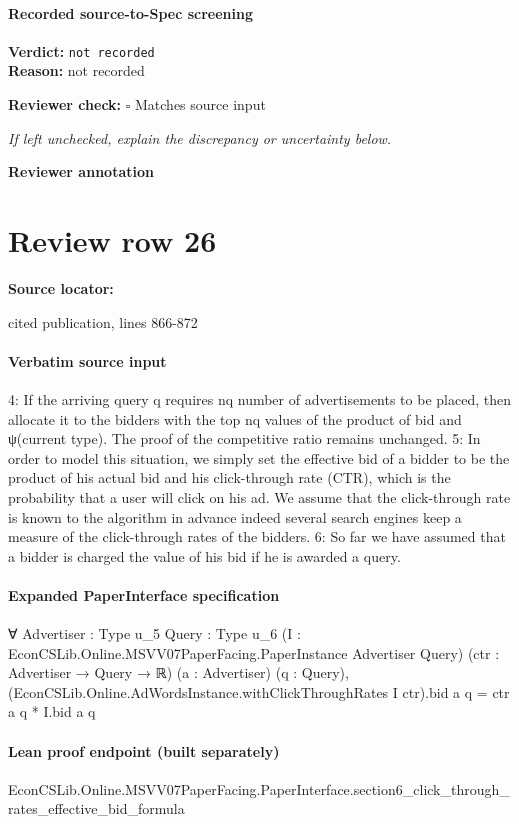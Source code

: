 \documentclass[10pt]{article}
\newcommand{\reviewerbox}{%
  \par\noindent\fbox{\parbox{0.96\linewidth}{\rule{0pt}{0.38in}}}\par
}
\newcommand{\reviewmatch}[1]{%
  \par\noindent\textbf{Reviewer check:} $\square$\; #1\par
  \noindent\emph{If left unchecked, explain the discrepancy or uncertainty below.}\par
}
\begin{document}
\paragraph{Recorded source-to-Spec screening}
\textbf{Verdict:} \texttt{not recorded}
\\
\textbf{Reason:} not recorded
\reviewmatch{Matches source input}
\noindent\textbf{Reviewer annotation}\par
\reviewerbox
\clearpage
\hypertarget{source-claim-4eaa2902ebe806c7}{}
\section*{Review row 26}
\textbf{Source locator:} {\footnotesize\raggedright cited publication, lines 866-\allowbreak{}872\par}
\paragraph{Verbatim source input}
\begin{ReviewVerbatim}
4: If the arriving query q requires nq number of advertisements to be placed, then allocate it
to the bidders with the top nq values of the product of bid and ψ(current type). The proof of
the competitive ratio remains unchanged.
5: In order to model this situation, we simply set the effective bid of a bidder to be the product
of his actual bid and his click-through rate (CTR), which is the probability that a user will
click on his ad. We assume that the click-through rate is known to the algorithm in advance indeed several search engines keep a measure of the click-through rates of the bidders.
6: So far we have assumed that a bidder is charged the value of his bid if he is awarded a query.
\end{ReviewVerbatim}


\paragraph{Expanded PaperInterface specification}
\begin{ReviewVerbatim}
∀ {Advertiser : Type u_5} {Query : Type u_6} (I : EconCSLib.Online.MSVV07PaperFacing.PaperInstance Advertiser Query)
  (ctr : Advertiser → Query → ℝ) (a : Advertiser) (q : Query),
  (EconCSLib.Online.AdWordsInstance.withClickThroughRates I ctr).bid a q = ctr a q * I.bid a q
\end{ReviewVerbatim}

\paragraph{Lean proof endpoint (built separately)}\begin{ReviewVerbatim}
EconCSLib.Online.MSVV07PaperFacing.PaperInterface.section6_click_through_rates_effective_bid_formula
\end{ReviewVerbatim}
\end{document}
